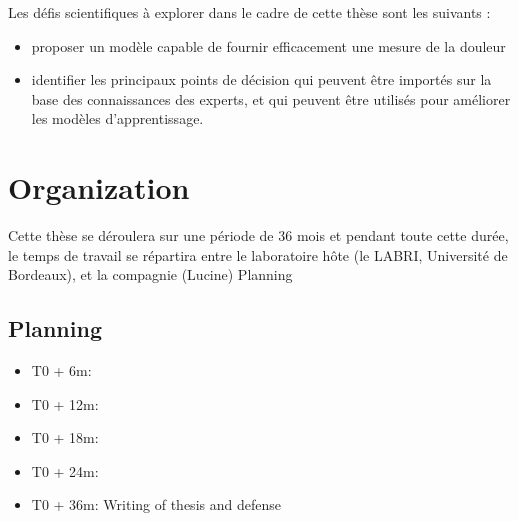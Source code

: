 \documentclass[11pt]{article}
\begin{document}
Les défis scientifiques à explorer dans le cadre de cette thèse sont les suivants :

\begin{itemize}
\item proposer un modèle capable de fournir efficacement une mesure de la douleur
\item identifier les principaux points de décision qui peuvent être importés sur
la base des connaissances des experts, et qui peuvent être utilisés pour
améliorer les modèles d’apprentissage.
\end{itemize}

\section{Organization}
\label{sec:org1cc9eab}
Cette thèse se déroulera sur une période de 36 mois et pendant toute cette
durée, le temps de travail se répartira entre le laboratoire hôte (le LABRI,
Université de Bordeaux), et la compagnie (Lucine) Planning
\subsection{Planning}
\label{sec:org8a30be3}
\begin{itemize}
\item T0 + 6m:
\item T0 + 12m:
\item T0 + 18m:
\item T0 + 24m:
\item T0 + 36m: Writing of thesis and defense
\end{itemize}





\end{document}
